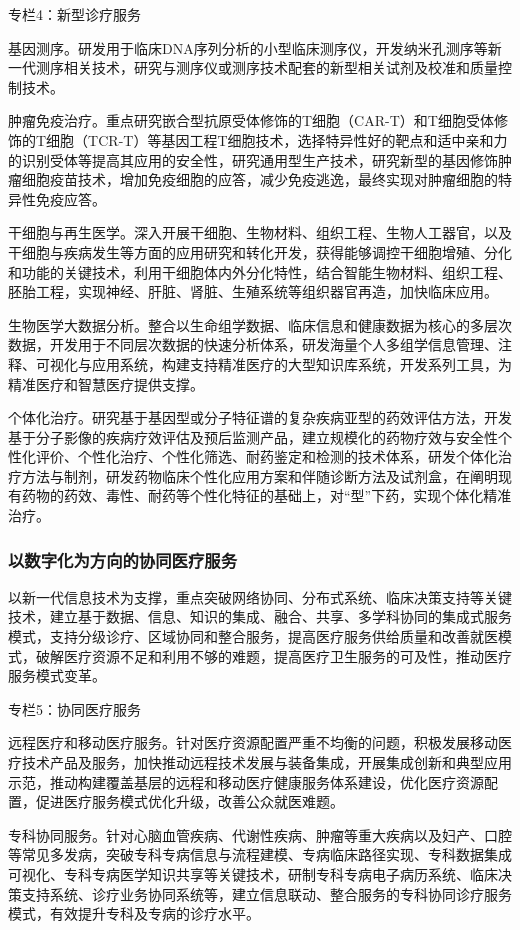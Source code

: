 \documentclass{article}
\begin{document}
\begin{minipage}{20em}
专栏4：新型诊疗服务

基因测序。研发用于临床DNA序列分析的小型临床测序仪，开发纳米孔测序等新一代测序相关技术，研究与测序仪或测序技术配套的新型相关试剂及校准和质量控制技术。

肿瘤免疫治疗。重点研究嵌合型抗原受体修饰的T细胞（CAR-T）和T细胞受体修饰的T细胞（TCR-T）等基因工程T细胞技术，选择特异性好的靶点和适中亲和力的识别受体等提高其应用的安全性，研究通用型生产技术，研究新型的基因修饰肿瘤细胞疫苗技术，增加免疫细胞的应答，减少免疫逃逸，最终实现对肿瘤细胞的特异性免疫应答。

干细胞与再生医学。深入开展干细胞、生物材料、组织工程、生物人工器官，以及干细胞与疾病发生等方面的应用研究和转化开发，获得能够调控干细胞增殖、分化和功能的关键技术，利用干细胞体内外分化特性，结合智能生物材料、组织工程、胚胎工程，实现神经、肝脏、肾脏、生殖系统等组织器官再造，加快临床应用。

生物医学大数据分析。整合以生命组学数据、临床信息和健康数据为核心的多层次数据，开发用于不同层次数据的快速分析体系，研发海量个人多组学信息管理、注释、可视化与应用系统，构建支持精准医疗的大型知识库系统，开发系列工具，为精准医疗和智慧医疗提供支撑。

个体化治疗。研究基于基因型或分子特征谱的复杂疾病亚型的药效评估方法，开发基于分子影像的疾病疗效评估及预后监测产品，建立规模化的药物疗效与安全性个性化评价、个性化治疗、个性化筛选、耐药鉴定和检测的技术体系，研发个体化治疗方法与制剂，研发药物临床个性化应用方案和伴随诊断方法及试剂盒，在阐明现有药物的药效、毒性、耐药等个性化特征的基础上，对“型”下药，实现个体化精准治疗。
\end{minipage}

\subsubsection{以数字化为方向的协同医疗服务}

以新一代信息技术为支撑，重点突破网络协同、分布式系统、临床决策支持等关键技术，建立基于数据、信息、知识的集成、融合、共享、多学科协同的集成式服务模式，支持分级诊疗、区域协同和整合服务，提高医疗服务供给质量和改善就医模式，破解医疗资源不足和利用不够的难题，提高医疗卫生服务的可及性，推动医疗服务模式变革。

\begin{minipage}{20em}
专栏5：协同医疗服务

远程医疗和移动医疗服务。针对医疗资源配置严重不均衡的问题，积极发展移动医疗技术产品及服务，加快推动远程技术发展与装备集成，开展集成创新和典型应用示范，推动构建覆盖基层的远程和移动医疗健康服务体系建设，优化医疗资源配置，促进医疗服务模式优化升级，改善公众就医难题。

专科协同服务。针对心脑血管疾病、代谢性疾病、肿瘤等重大疾病以及妇产、口腔等常见多发病，突破专科专病信息与流程建模、专病临床路径实现、专科数据集成可视化、专科专病医学知识共享等关键技术，研制专科专病电子病历系统、临床决策支持系统、诊疗业务协同系统等，建立信息联动、整合服务的专科协同诊疗服务模式，有效提升专科及专病的诊疗水平。
\end{minipage}
\end{document}
